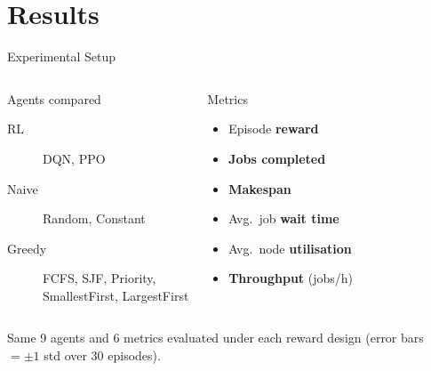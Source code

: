 
\section{Results}

\begin{frame}{Experimental Setup}
  \begin{columns}[T,onlytextwidth]
      \begin{block}{Agents compared}
        \footnotesize
        \begin{minipage}[t][3.4cm]{\linewidth}
        \begin{description}
          \item[\textcolor{SoftCoral}{RL}] DQN, PPO
          \item[\textcolor{SkyBlue!70!black}{Naive}] Random, Constant
          \item[\textcolor{DeepBlue}{Greedy}] FCFS, SJF, Priority,\\ SmallestFirst, LargestFirst
        \end{description}
        \end{minipage}
      \end{block}

      \begin{block}{Metrics}
        \footnotesize
        \begin{minipage}[t][3.4cm]{\linewidth}
        \begin{itemize}\setlength\itemsep{2pt}
          \item Episode \textbf{reward}
          \item \textbf{Jobs completed}
          \item \textbf{Makespan}
          \item Avg.\ job \textbf{wait time}
          \item Avg.\ node \textbf{utilisation}
          \item \textbf{Throughput} (jobs/h)
        \end{itemize}
        \end{minipage}
      \end{block}
  \end{columns}

  \vspace{0.4em}
  \centering
  \small\textcolor{DeepBlue}{Same 9 agents and 6 metrics evaluated under each reward design (error bars $=\pm1$ std over 30 episodes).}
\end{frame}

